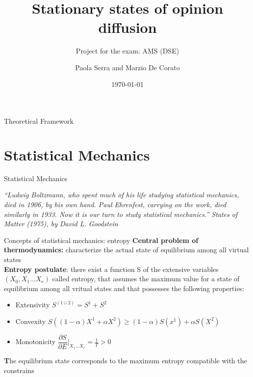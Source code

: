 \documentclass{beamer}
\title[AMS project]{ Stationary states of opinion diffusion}
\subtitle{Project for the exam: AMS (DSE)}
\author{Paola Serra and Marzio De Corato }
\date{\today}
\begin{document}
\begin{frame}
\vspace{+4.2 cm}  \titlepage
\end{frame}

\usebackgroundtemplate{ } 






\begin{frame}{}
\begin{center}
{\Huge Theoretical Framework}
\end{center}
\end{frame}


\section{Statistical Mechanics}

\begin{frame}{}
\begin{center}
{\Huge Statistical Mechanics}
\end{center}
\begin{center}
\textit{“Ludwig Boltzmann, who spent much of his life studying statistical mechanics, died in 1906, by his own hand. Paul Ehrenfest, carrying on the work, died similarly in 1933. Now it is our turn to study statistical mechanics.” States of Matter (1975), by David L. Goodstein}
\end{center}
\end{frame}

\begin{frame}{Concepts of statistical mechanics: entropy \cite{peliti2011statistical}}
\textbf{Central problem of thermodynamics:} characterize the actual state of equilibrium among all virtual states  \\
\textbf{Entropy postulate}: there exist a function S of the extensive variables $(X_{0},X_{1}...X_{r})$ called entropy,  that assumes the maximum value for a state of equilibrium among all vritual states and that possesses the following properties:
\begin{itemize}
\item Extensivity $S^{(1\cup2)}=S^{1}+S^{2}$
\item Convexity $S((1-\alpha)X^{1}+\alpha X^{2}) \geq (1-\alpha)S(x^{1})+\alpha S(X^{2})$
\item Monotonicity $\dfrac{\partial S}{\partial E}|_{X_{1}...X_{r}}=\frac{1}{T}>0$
\end{itemize}
\textbf The equilibrium state corresponds to the maximum entropy compatible with the constrains

\end{frame}
\end{document}
